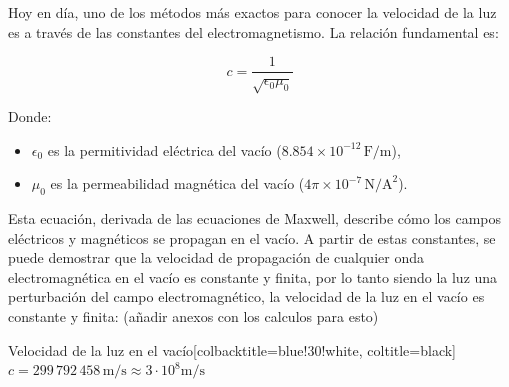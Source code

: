 

\vspace{0.3cm}


Hoy en día, uno de los métodos más exactos para conocer la velocidad de la luz es a través de las constantes del electromagnetismo. La relación fundamental es:

\[
c = \frac{1}{\sqrt{\epsilon_0 \mu_0}}
\]

Donde:
\begin{itemize}
	\item $\epsilon_0$ es la permitividad eléctrica del vacío ($8.854 \times 10^{-12}\, \text{F/m}$),
	\item $\mu_0$ es la permeabilidad magnética del vacío ($4\pi \times 10^{-7}\, \text{N/A}^2$).
\end{itemize}

Esta ecuación, derivada de las ecuaciones de Maxwell, describe cómo los campos eléctricos y magnéticos se propagan en el vacío. A partir de estas constantes, se puede demostrar que la velocidad de propagación de cualquier onda electromagnética en el vacío es constante y finita, por lo tanto siendo la luz una perturbación del campo electromagnético, la velocidad de la luz en el vacío es constante y finita: 
(añadir anexos con los calculos para esto)

\begin{mybox}[blue]{Velocidad de la luz en el vacío}[colbacktitle=blue!30!white, coltitle=black]
	$c = 299\,792\,458 \, \text{m/s} \approx 3\cdot10^8 \text{m/s}$ 
\end{mybox}



\vspace{0.3cm}

